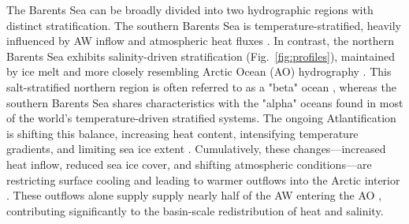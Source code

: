 \documentclass[draft]{agujournal2019}
\begin{document}
The Barents Sea can be broadly divided into two hydrographic regions with distinct stratification. The southern Barents Sea is temperature-stratified, heavily influenced by AW inflow and atmospheric heat fluxes \cite{Hakkinen2009}. In contrast, the northern Barents Sea exhibits salinity-driven stratification (Fig.~\ref{fig:profiles}), maintained by ice melt and more closely resembling Arctic Ocean (AO) hydrography \cite{kolas2024}. This salt-stratified northern region is often referred to as a "beta" ocean \cite{Nansen1902,Carmack2007,Stewart2016}, whereas the southern Barents Sea shares characteristics with the "alpha" oceans found in most of the world’s temperature-driven stratified systems. The ongoing Atlantification is shifting this balance, increasing heat content, intensifying temperature gradients, and limiting sea ice extent \cite{Barton18}. Cumulatively, these changes—increased heat inflow, reduced sea ice cover, and shifting atmospheric conditions—are restricting surface cooling and leading to warmer outflows into the Arctic interior \cite{Skagseth2020}. These outflows alone supply supply nearly half of the AW entering the AO \cite{Lien_Trofimov_2013}, contributing significantly to the basin-scale redistribution of heat and salinity.
\end{document}
